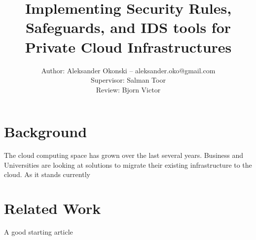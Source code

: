 \documentclass[12pt]{article}
\title{Implementing Security Rules, Safeguards, and IDS tools for Private Cloud Infrastructures}
\author{Author: Aleksander Okonski -- aleksander.oko@gmail.com \\ Supervisor: Salman Toor \\ Review: Bjorn Victor }
\date{}
\begin{document}
\maketitle
\newpage
\tableofcontents
\newpage

\section{Background}
The cloud computing space has grown over the last several years. Business and Universities are looking at solutions to migrate their existing infrastructure to the cloud. As it stands currently
%

\section{Related Work}
A good starting article \cite{SurveyOfIDS}



\end{document}
